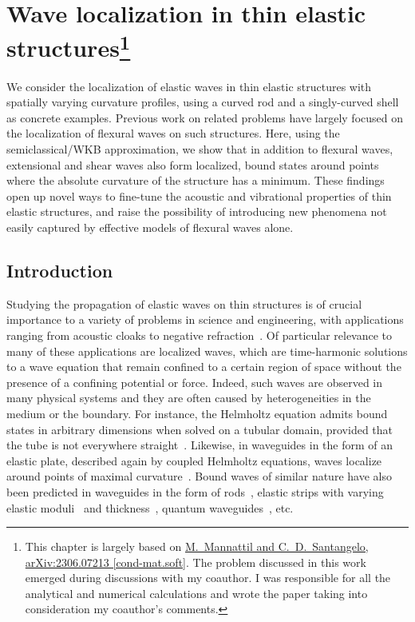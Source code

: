 
\chapter[Wave localization in thin elastic structures]{Wave localization in thin elastic structures\footnote{
  This chapter is largely based on \href{https://arxiv.org/abs/2306.07213}{M.~Mannattil and C.~D.~Santangelo, arXiv:2306.07213 [cond-mat.soft]}.
  The problem discussed in this work emerged during discussions with my coauthor.
  I was responsible for all the analytical and numerical calculations and wrote the paper taking into consideration my coauthor's comments.
}}

We consider the localization of elastic waves in thin elastic structures with spatially varying curvature profiles, using a curved rod and a singly-curved shell as concrete examples.
Previous work on related problems have largely focused on the localization of flexural waves on such structures.
Here, using the semiclassical/WKB approximation, we show that in addition to flexural waves, extensional and shear waves also form localized, bound states around points where the absolute curvature of the structure has a minimum.
These findings open up novel ways to fine-tune the acoustic and vibrational properties of thin elastic structures, and raise the possibility of introducing new phenomena not easily captured by effective models of flexural waves alone.\\[-1em]

\section{Introduction}
\label{sec:introduction}

Studying the propagation of elastic waves on thin structures is of crucial importance to a variety of problems in science and engineering, with applications ranging from acoustic cloaks to negative refraction~\cite{farhat2009,craster2012,zangeneh-nejad2019}.
Of particular relevance to many of these applications are localized waves, which are time-harmonic solutions to a wave equation that remain confined to a certain region of space without the presence of a confining potential or force.
Indeed, such waves are observed in many physical systems and they are often caused by heterogeneities in the medium or the boundary.
For instance, the Helmholtz equation admits bound states in arbitrary dimensions when solved on a tubular domain, provided that the tube is not everywhere straight~\cite{goldstone1992}.
Likewise, in waveguides in the form of an elastic plate, described again by coupled Helmholtz equations, waves localize around points of maximal curvature~\cite{gridin2005}.
Bound waves of similar nature have also been predicted in waveguides in the form of rods~\cite{gridin2005a}, elastic strips with varying elastic moduli~\cite{forster2006} and thickness~\cite{postnova2008}, quantum waveguides~\cite{duclos1995}, etc.

